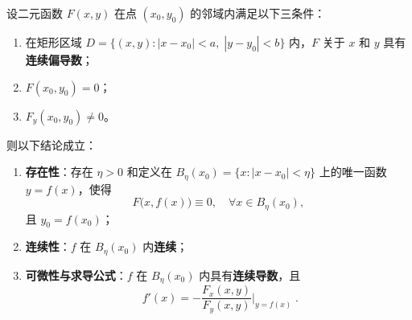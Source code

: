 \documentclass[lang=cn,11pt]{elegantbook}
\begin{document}
\begin{theorem} \label{thm:implicit-function}
设二元函数 $F(x,y)$ 在点 $(x_0,y_0)$ 的邻域内满足以下三条件：
\begin{enumerate}
  \item[(A)] 在矩形区域 $D=\{(x,y):|x-x_0|<a,\;|y-y_0|<b\}$ 内，$F$ 关于 $x$ 和 $y$ 具有\textbf{连续偏导数}；
  \item[(B)] $F(x_0,y_0)=0$；
  \item[(C)] $F_y(x_0,y_0) \neq 0$。
\end{enumerate}
则以下结论成立：
\begin{enumerate}
  \item[\textbf{(I)}] \textbf{存在性}：存在 $\eta>0$ 和定义在 $B_\eta(x_0)=\{x:|x-x_0|<\eta\}$ 上的唯一函数 $y=f(x)$，使得
        \[
        F\bigl(x,f(x)\bigr)\equiv 0,\quad\forall x\in B_\eta(x_0),
        \]
        且 $y_0=f(x_0)$；
  \item[\textbf{(II)}] \textbf{连续性}：$f$ 在 $B_\eta(x_0)$ 内\textbf{连续}；
  \item[\textbf{(III)}] \textbf{可微性与求导公式}：$f$ 在 $B_\eta(x_0)$ 内具有\textbf{连续导数}，且
        \[
        \boxed{\;f'(x)=-\frac{F_x(x,y)}{F_y(x,y)}\Big|_{y=f(x)}\;}.
        \]
\end{enumerate}
\end{theorem}
\end{document}

